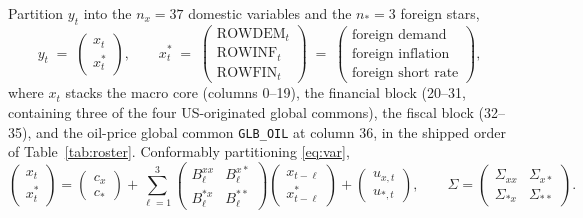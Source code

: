 \documentclass[11pt]{article}
\newcommand{\code}[1]{\texttt{\small #1}}
\begin{document}
Partition $y_t$ into the $n_x = 37$ domestic variables and the $n_* = 3$ foreign stars,
\begin{equation}\label{eq:partition}
  y_t \;=\;
  \begin{pmatrix} x_t \\ x^{*}_t \end{pmatrix},
  \qquad
  x^{*}_t \;=\;
  \begin{pmatrix}
    \mathrm{ROWDEM}_t \\ \mathrm{ROWINF}_t \\ \mathrm{ROWFIN}_t
  \end{pmatrix}
  \;=\;
  \begin{pmatrix}
    \text{foreign demand} \\ \text{foreign inflation} \\ \text{foreign short rate}
  \end{pmatrix},
\end{equation}
where $x_t$ stacks the macro core (columns 0--19), the financial block (20--31, containing three
of the four US-originated global commons), the fiscal block (32--35), and the oil-price global
common \code{GLB\_OIL} at column 36, in the shipped order of Table~\ref{tab:roster}. Conformably partitioning \eqref{eq:var},
\begin{equation}\label{eq:blocks}
  \begin{pmatrix} x_t \\ x^{*}_t \end{pmatrix}
  =
  \begin{pmatrix} c_x \\ c_* \end{pmatrix}
  + \sum_{\ell=1}^{3}
  \begin{pmatrix}
    B^{xx}_\ell & B^{x*}_\ell \\[2pt]
    B^{*x}_\ell & B^{**}_\ell
  \end{pmatrix}
  \begin{pmatrix} x_{t-\ell} \\ x^{*}_{t-\ell} \end{pmatrix}
  +
  \begin{pmatrix} u_{x,t} \\ u_{*,t} \end{pmatrix},
  \qquad
  \Sigma =
  \begin{pmatrix}
    \Sigma_{xx} & \Sigma_{x*} \\
    \Sigma_{*x} & \Sigma_{**}
  \end{pmatrix}.
\end{equation}
\end{document}
